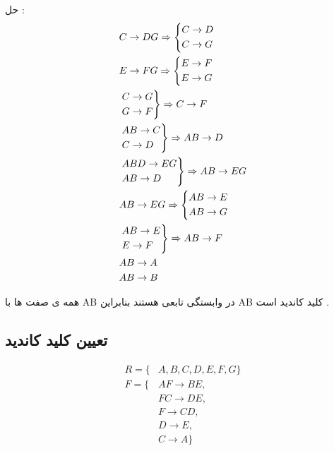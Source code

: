 \documentclass{article}
\begin{document}
حل :
\begin{align*}
&C \to DG \Rightarrow  \begin{cases*} C \to D \\ C \to G  \end{cases*} \\
&E \to FG \Rightarrow  \begin{cases*} E \to F \\ E \to G  \end{cases*} \\
& \begin{rcases*}C \to G \\ G \to F  \end{rcases*} \Rightarrow C \to F \\
& \begin{rcases*}AB \to C \\ C \to D  \end{rcases*} \Rightarrow AB \to D \\
& \begin{rcases*}ABD \to EG \\ AB \to D  \end{rcases*} \Rightarrow AB \to EG \\
&AB \to EG \Rightarrow  \begin{cases*} AB \to E \\ AB \to G  \end{cases*} \\
& \begin{rcases*}AB \to E \\ E \to F  \end{rcases*} \Rightarrow AB \to F \\
&AB \to A \\
&AB \to B \\
\end{align*}

همه ی صفت ها با AB در وابستگی تابعی هستند بنابراین AB کلید کاندید است .




\subsection{تعیین کلید کاندید }

\begin{align*}
R = \{ &A , B , C , D , E , F , G \}  \\
F = \{ &AF \to BE , \\
&FC \to DE , \\
&F \to CD , \\
&D \to E , \\
&C \to A \}
\end{align*}
\end{document}
